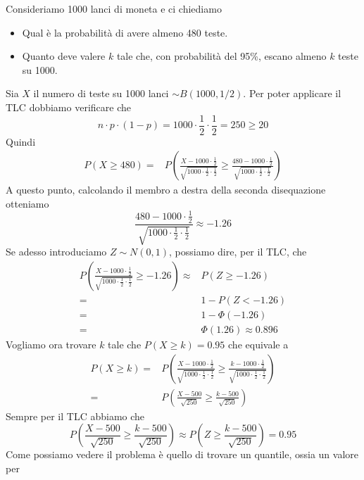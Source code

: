 \begin{example}
	Consideriamo 1000 lanci di moneta e ci chiediamo
	\begin{itemize}
		\item Qual è la probabilità di avere almeno 480 teste.
		\item Quanto deve valere $k$ tale che, con probabilità del 95\%, escano almeno $k$ teste su
		      1000.
	\end{itemize}
	Sia $X$ il numero di teste su 1000 lanci $\sim B(1000, 1/2)$. Per poter applicare il TLC
	dobbiamo verificare che
	\[ n \cdot p \cdot (1-p) = 1000 \cdot \frac{1}{2} \cdot \frac{1}{2} = 250 \geq 20 \]
	Quindi
	\begin{align*}
		P(X \geq 480) = & P \left( \frac{X - 1000 \cdot \frac{1}{2}}
		{\sqrt{1000 \cdot \frac{1}{2} \cdot \frac{1}{2}}} \geq
		\frac{480 - 1000 \cdot \frac{1}{2}}{\sqrt{1000 \cdot \frac{1}{2} \cdot \frac{1}{2}}} \right)
	\end{align*}
	A questo punto, calcolando il membro a destra della seconda disequazione otteniamo
	\[
		\frac{480 - 1000 \cdot \frac{1}{2}}{\sqrt{1000 \cdot \frac{1}{2} \cdot \frac{1}{2}}}
		\approx -1.26
	\]
	Se adesso introduciamo $Z \sim N(0,1)$, possiamo dire, per il TLC, che
	\begin{align*}
		P \left( \frac{X - 1000 \cdot \frac{1}{2}}
		{\sqrt{1000 \cdot \frac{1}{2} \cdot \frac{1}{2}}}
		\geq -1.26 \right) \approx & P(Z \geq -1.26)          \\
		=                          & 1 - P(Z < -1.26)         \\
		=                          & 1 - \Phi (-1.26)         \\
		=                          & \Phi(1.26) \approx 0.896
	\end{align*}
	Vogliamo ora trovare $k$ tale che $P(X \geq k) = 0.95$ che equivale a
	\begin{align*}
		P(X \geq k) = & P \left( \frac{X - 1000 \cdot \frac{1}{2}}
		{\sqrt{1000 \cdot \frac{1}{2} \cdot \frac{1}{2}}} \geq \frac{k - 1000 \cdot \frac{1}{2}}
		{\sqrt{1000 \cdot \frac{1}{2} \cdot \frac{1}{2}}} \right)  \\
		=             & P \left( \frac{X - 500}{\sqrt{250}} \geq
		\frac{k - 500}{\sqrt{250}} \right)
	\end{align*}
	Sempre per il TLC abbiamo che
	\[
		P \left( \frac{X - 500}{\sqrt{250}} \geq
		\frac{k - 500}{\sqrt{250}} \right) \approx
		P\left( Z \geq \frac{k - 500}{\sqrt{250}} \right) = 0.95
	\]
	Come possiamo vedere il problema è quello di trovare un quantile, ossia un valore per

\end{example}
